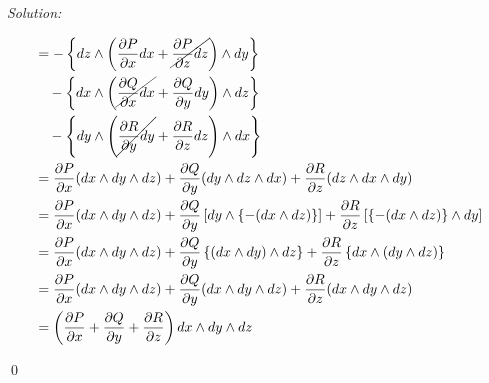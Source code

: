 \documentclass[12pt]{article}
\theoremstyle{definition}
\newenvironment{problem}[2][Problem]{\begin{trivlist}
\item[\hskip \labelsep {\bfseries #1}\hskip \labelsep {\bfseries #2.}]}{\end{trivlist}}
\newenvironment{sol}
{\emph{Solution:}
}
{
    \qed
    }
\begin{document}
\begin{sol}
\begin{align*}
           &= - \left\{ dz \wedge \left(\frac{\partial{P}}{\partial{x}}dx+\cancel{\frac{\partial{P}}{\partial{z}}dz}\right) \wedge dy \right\}\\
           &\quad - \left\{ dx \wedge \left(\cancel{\frac{\partial{Q}}{\partial{x}}dx}+\frac{\partial{Q}}{\partial{y}}dy\right) \wedge dz \right\}\\
           &\quad - \left\{ dy \wedge \left(\cancel{\frac{\partial{R}}{\partial{y}}dy}+\frac{\partial{R}}{\partial{z}}dz\right) \wedge dx \right\}\\
           &= \frac{\partial{P}}{\partial{x}}(dx \wedge dy \wedge dz)
            + \frac{\partial{Q}}{\partial{y}}(dy \wedge dz \wedge dx)
            + \frac{\partial{R}}{\partial{z}}(dz \wedge dx \wedge dy) \\
           &= \frac{\partial{P}}{\partial{x}}(dx \wedge dy \wedge dz)
            + \frac{\partial{Q}}{\partial{y}}\left[dy \wedge \left\{-(dx \wedge dz)\right\}\right]
            + \frac{\partial{R}}{\partial{z}}\left[\left\{-(dx \wedge dz)\right\} \wedge dy\right] \\
           &= \frac{\partial{P}}{\partial{x}}(dx \wedge dy \wedge dz)
            + \frac{\partial{Q}}{\partial{y}}\left\{(dx \wedge dy) \wedge dz\right\}
            + \frac{\partial{R}}{\partial{z}}\left\{dx \wedge (dy \wedge dz)\right\} \\
           &= \frac{\partial{P}}{\partial{x}}(dx \wedge dy \wedge dz)
            + \frac{\partial{Q}}{\partial{y}}(dx \wedge dy \wedge dz)
            + \frac{\partial{R}}{\partial{z}}(dx \wedge dy \wedge dz) \\
           &= \left( \frac{\partial{P}}{\partial{x}}+\frac{\partial{Q}}{\partial{y}}+\frac{\partial{R}}{\partial{z}} \right) dx \wedge dy \wedge dz
    \end{align*}
    

\end{sol}






\end{document}
